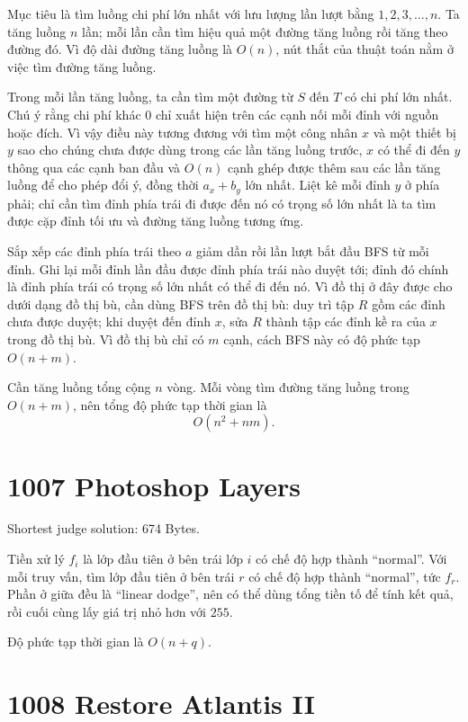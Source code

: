 \documentclass[11pt]{article}
\begin{document}
Mục tiêu là tìm luồng chi phí lớn nhất với lưu lượng lần lượt bằng
$1,2,3,\ldots,n$. Ta tăng luồng $n$ lần; mỗi lần cần tìm hiệu quả một đường
tăng luồng rồi tăng theo đường đó. Vì độ dài đường tăng luồng là $O(n)$, nút
thắt của thuật toán nằm ở việc tìm đường tăng luồng.

Trong mỗi lần tăng luồng, ta cần tìm một đường từ $S$ đến $T$ có chi phí lớn
nhất. Chú ý rằng chi phí khác $0$ chỉ xuất hiện trên các cạnh nối mỗi đỉnh
với nguồn hoặc đích. Vì vậy điều này tương đương với tìm một công nhân $x$
và một thiết bị $y$ sao cho chúng chưa được dùng trong các lần tăng luồng
trước, $x$ có thể đi đến $y$ thông qua các cạnh ban đầu và $O(n)$ cạnh ghép
được thêm sau các lần tăng luồng để cho phép đổi ý, đồng thời $a_x+b_y$ lớn
nhất. Liệt kê mỗi đỉnh $y$ ở phía phải; chỉ cần tìm đỉnh phía trái đi được
đến nó có trọng số lớn nhất là ta tìm được cặp đỉnh tối ưu và đường tăng
luồng tương ứng.

Sắp xếp các đỉnh phía trái theo $a$ giảm dần rồi lần lượt bắt đầu BFS từ mỗi
đỉnh. Ghi lại mỗi đỉnh lần đầu được đỉnh phía trái nào duyệt tới; đỉnh đó
chính là đỉnh phía trái có trọng số lớn nhất có thể đi đến nó. Vì đồ thị ở
đây được cho dưới dạng đồ thị bù, cần dùng BFS trên đồ thị bù: duy trì tập
$R$ gồm các đỉnh chưa được duyệt; khi duyệt đến đỉnh $x$, sửa $R$ thành tập
các đỉnh kề ra của $x$ trong đồ thị bù. Vì đồ thị bù chỉ có $m$ cạnh, cách
BFS này có độ phức tạp $O(n+m)$.

Cần tăng luồng tổng cộng $n$ vòng. Mỗi vòng tìm đường tăng luồng trong
$O(n+m)$, nên tổng độ phức tạp thời gian là
\[
  O(n^2+nm).
\]

\section{1007 Photoshop Layers}

Shortest judge solution: 674 Bytes.

Tiền xử lý $f_i$ là lớp đầu tiên ở bên trái lớp $i$ có chế độ hợp thành
``normal''. Với mỗi truy vấn, tìm lớp đầu tiên ở bên trái $r$ có chế độ hợp
thành ``normal'', tức $f_r$. Phần ở giữa đều là ``linear dodge'', nên có thể
dùng tổng tiền tố để tính kết quả, rồi cuối cùng lấy giá trị nhỏ hơn với
$255$.

Độ phức tạp thời gian là $O(n+q)$.

\section{1008 Restore Atlantis II}
\end{document}
